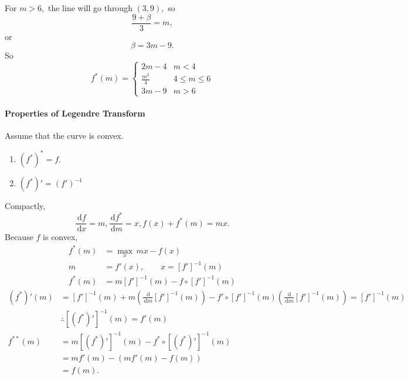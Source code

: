 \documentclass[12pt]{article}
\theoremstyle{remark}
\newcommand{\diffn}[1]{\,\mathrm{d}{#1}}
\newcommand{\fdiffn}[2]{\frac{\diffn{#1}}{\diffn{#2}}}
\begin{document}
For $m>6,$ the line will go through $(3,9),$ so
\[\frac{9+\beta}{3}=m,\] or
\[\beta=3m-9.\]
So
\[f^\ast(m)=\begin{cases}
    2m-4& m<4\\
    \frac{m^2}{4}&4\le m\le 6\\
    3m-9 & m>6
\end{cases}\]

\paragraph{Properties of Legendre Transform}
Assume that the curve is convex.


\begin{enumerate}
    \item $(f^\ast)^\ast=f.$ 
    \item $(f^\ast)'=(f')^{-1}$
\end{enumerate}
Compactly,
\[\fdiffn{f}{x}=m,\fdiffn{f^\ast}{m}=x,f(x)+f^\ast(m)=mx.\]
Because $f$ is convex,
\begin{align*}
    f^\ast(m)& = \max_x \,mx - f(x) \\
    m &= f'(x), \qquad x = [f']^{-1}(m)  \\
    f^\ast(m) &= m [f']^{-1}(m) - f\circ [f']^{-1}(m)
    \end{align*}
    \begin{align*}
    (f^\ast)'(m) &= [f']^{-1}(m) + m \left(\fdiffn{}{m} [f']^{-1}(m)\right)-f'\circ[f']^{-1}(m)\left(\fdiffn{}{m}[f']^{-1}(m)\right)=[f']^{-1}(m) \\ &\therefore [(f^\ast)']^{-1}(m)=f'(m)\\
    f^{\ast\ast}(m) &= m [(f^\ast)']^{-1}(m) - f^\ast \circ [(f^{\ast})']^{-1}(m) \\
    &= m f'(m) - (mf'(m) - f(m)) \\
    &= f(m).
\end{align*}
\end{document}
